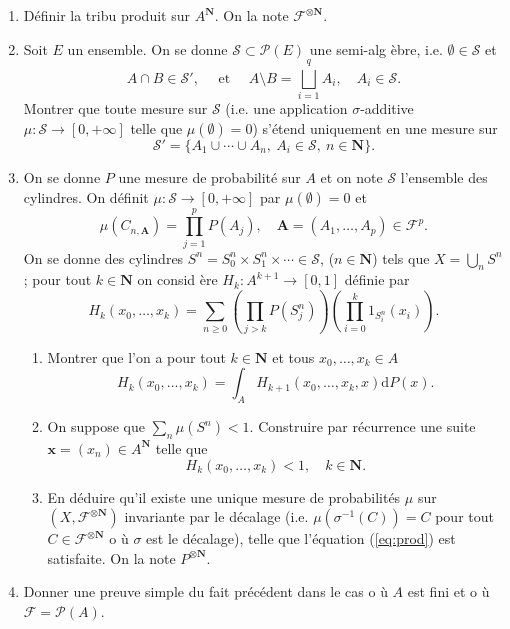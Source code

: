 \documentclass[a4paper,10pt,openany]{article}
\theoremstyle{plain}
\theoremstyle{definition}
\newcommand{\dd}{\mathrm{d}}
\newcommand{\N}{\mathbf{N}}
\newcommand{\F}{\mathcal{F}}
\newcommand{\Fcal}{\mathcal{F}}
\newcommand{\Pcal}{\mathcal{P}}
\newcommand{\Scal}{\mathcal{S}}
\begin{document}
\begin{enumerate}
\item D\'efinir la tribu produit sur $A^\N$. On la note $\mathcal{F}^{\otimes \N}$.
\item Soit $E$ un ensemble. On se donne $\Scal \subset \Pcal(E)$ une semi-alg \`ebre, i.e. $\emptyset \in \Scal$ et 
$$
A \cap B \in \Scal', \quad \text{ et }\quad A \setminus B = \bigsqcup_{i=1}^q A_i, \quad A_i \in \Scal.
$$
Montrer que toute mesure sur $\Scal$ (i.e. une application $\sigma$-additive $\mu : \Scal \to [0, +\infty]$ telle que $\mu(\emptyset) = 0$) s'\'etend uniquement en une mesure sur 
$$
\Scal' = \{A_1 \cup \cdots \cup A_n,~A_i \in \Scal,~n \in \N\}.
$$
\item On se donne $P$ une mesure de probabilit\'e sur $A$ et on note $\Scal$ l'ensemble des cylindres. On d\'efinit $\mu : \Scal \to [0, +\infty]$ par $\mu(\emptyset) = 0$ et
\begin{equation}\label{eq:prod}
\mu\left(C_{n,\mathbf{A}}\right) = \prod_{j=1}^p P(A_j), \quad \mathbf{A} = (A_1, \dots, A_p) \in \mathcal{F}^p.
\end{equation}
On se donne des cylindres $S^n = S^n_0 \times S^n_1 \times \cdots \in \Scal$, ($n \in \N$) tels que $X= \bigcup_n S^n$ ; pour tout $k \in \N$ on consid \`ere
$
H_k : A^{k+1} \to [0,1]
$
d\'efinie par
$$
H_k(x_0, \dots, x_k) = \sum_{n \geq 0} \left( \prod_{j > k} P(S^n_j)\right)\left(\prod_{i=0}^k 1_{S^n_i}(x_i)\right).
$$
\begin{enumerate}
\item Montrer que l'on a pour tout $k \in \N$ et tous $x_0, \dots, x_k \in A$
$$
H_k(x_0, \dots, x_k) = \int_A H_{k+1}(x_0, \dots, x_k, x) \dd P(x).
$$
\item On suppose que $\sum_n \mu(S^n) < 1$. Construire par r\'ecurrence une suite $\mathbf{x} = (x_n) \in A^\N$ telle que 
$$
H_k(x_0, \dots, x_k) < 1, \quad k \in \N.
$$
\item En d\'eduire qu'il existe une unique mesure de probabilit\'es $\mu$ sur $(X, \F^{\otimes \N})$ invariante par le d\'ecalage (i.e. $\mu(\sigma^{-1}(C)) = C$ pour tout $C \in \Fcal^{\otimes \N}$ o \`u $\sigma$ est le d\'ecalage), telle que l'\'equation (\ref{eq:prod}) est satisfaite. On la note $P^{\otimes \N}.$
\end{enumerate}

\item Donner une preuve simple du fait pr\'ec\'edent dans le cas o \`u $A$ est fini et o \`u $\mathcal{F} = \mathcal{P}(A)$.
\end{enumerate}
\end{document}
